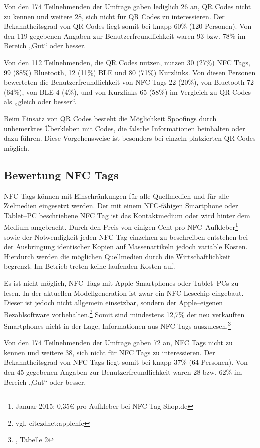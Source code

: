 Von den 174 Teilnehmenden der Umfrage gaben lediglich 26 an, QR Codes nicht zu kennen und weitere 28, sich nicht für QR Codes zu interessieren. Der Bekanntheitsgrad von QR Codes liegt somit bei knapp 60\% (120 Personen). Von den 119 gegebenen Angaben zur Benutzerfreundlichkeit waren 93 bzw. 78\% im Bereich „Gut“ oder besser.

Von den 112 Teilnehmenden, die QR Codes nutzen, nutzen 30 (27\%) NFC Tags, 99 (88\%) Bluetooth, 12 (11\%) \ac{BLE} und 80 (71\%) Kurzlinks. Von diesen Personen bewerteten die  Benutzerfreundlichkeit von NFC Tags 22 (20\%), von Bluetooth 72 (64\%), von \ac{BLE} 4 (4\%), und von Kurzlinks 65 (58\%) im Vergleich zu QR Codes als „gleich oder besser“.

Beim Einsatz von QR Codes besteht die Möglichkeit Spoofings durch unbemerktes Überkleben mit Codes, die falsche Informationen beinhalten oder dazu führen. Diese Vorgehensweise ist besonders bei einzeln platzierten QR Codes möglich. 

\subsection{Bewertung NFC Tags} %
\label{sub:bewertung_nfc_tags}
NFC Tags können mit Einschränkungen für alle Quellmedien und für alle Zielmedien eingesetzt werden. Der mit einem NFC-fähigen Smartphone oder Tablet–PC beschriebene NFC Tag ist das Kontaktmedium oder wird hinter dem Medium angebracht. Durch den Preis von einigen Cent pro NFC–Aufkleber\footnote{Januar 2015: 0,35€ pro Aufkleber bei NFC-Tag-Shop.de} sowie der Notwendigkeit jeden NFC Tag einzelnen zu beschreiben entstehen bei der Ausbringung identischer Kopien auf Massenartikeln jedoch variable Kosten. Hierdurch werden die möglichen Quellmedien durch die Wirtschaftlichkeit begrenzt. Im Betrieb treten keine laufenden Kosten auf.

Es ist nicht möglich, NFC Tags mit Apple Smartphones oder Tablet–PCs zu lesen. In der aktuellen Modellgeneration ist zwar ein NFC Lesechip eingebaut. Dieser ist jedoch nicht allgemein einsetzbar, sondern der Apple–eigenen Bezahlsoftware vorbehalten.\footnote{vgl. cite{zdnet:applenfc}}
Somit sind mindestens 12,7\% der neu verkauften Smartphones nicht in der Lage, Informationen aus NFC Tags auszulesen.\footnote{\cite{garnter:os}, Tabelle 2}

Von den 174 Teilnehmenden der Umfrage gaben 72 an, NFC Tags nicht zu kennen und weitere 38, sich nicht für NFC Tags zu interessieren. Der Bekanntheitsgrad von NFC Tags liegt somit bei knapp 37\% (64 Personen). Von den 45 gegebenen Angaben zur Benutzerfreundlichkeit waren 28 bzw. 62\% im Bereich „Gut“ oder besser. 

